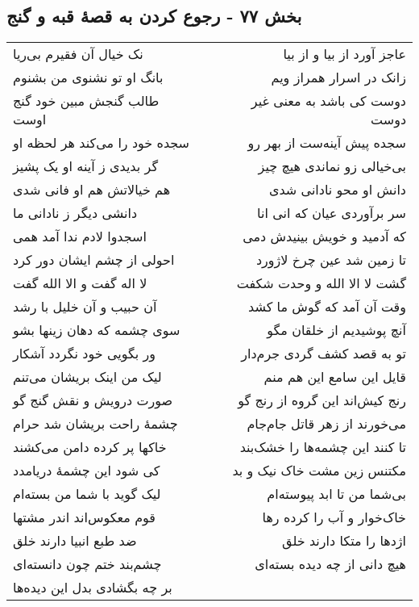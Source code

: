 \begin{center}
\section*{بخش ۷۷ - رجوع کردن به قصهٔ قبه و گنج}
\label{sec:sh077}
\begin{longtable}{l p{0.5cm} r}
نک خیال آن فقیرم بی‌ریا
&&
عاجز آورد از بیا و از بیا
\\
بانگ او تو نشنوی من بشنوم
&&
زانک در اسرار همراز ویم
\\
طالب گنجش مبین خود گنج اوست
&&
دوست کی باشد به معنی غیر دوست
\\
سجده خود را می‌کند هر لحظه او
&&
سجده پیش آینه‌ست از بهر رو
\\
گر بدیدی ز آینه او یک پشیز
&&
بی‌خیالی زو نماندی هیچ چیز
\\
هم خیالاتش هم او فانی شدی
&&
دانش او محو نادانی شدی
\\
دانشی دیگر ز نادانی ما
&&
سر برآوردی عیان که انی انا
\\
اسجدوا لادم ندا آمد همی
&&
که آدمید و خویش بینیدش دمی
\\
احولی از چشم ایشان دور کرد
&&
تا زمین شد عین چرخ لاژورد
\\
لا اله گفت و الا الله گفت
&&
گشت لا الا الله و وحدت شکفت
\\
آن حبیب و آن خلیل با رشد
&&
وقت آن آمد که گوش ما کشد
\\
سوی چشمه که دهان زینها بشو
&&
آنچ پوشیدیم از خلقان مگو
\\
ور بگویی خود نگردد آشکار
&&
تو به قصد کشف گردی جرم‌دار
\\
لیک من اینک بریشان می‌تنم
&&
قایل این سامع این هم منم
\\
صورت درویش و نقش گنج گو
&&
رنج کیش‌اند این گروه از رنج گو
\\
چشمهٔ راحت بریشان شد حرام
&&
می‌خورند از زهر قاتل جام‌جام
\\
خاکها پر کرده دامن می‌کشند
&&
تا کنند این چشمه‌ها را خشک‌بند
\\
کی شود این چشمهٔ دریامدد
&&
مکتنس زین مشت خاک نیک و بد
\\
لیک گوید با شما من بسته‌ام
&&
بی‌شما من تا ابد پیوسته‌ام
\\
قوم معکوس‌اند اندر مشتها
&&
خاک‌خوار و آب را کرده رها
\\
ضد طبع انبیا دارند خلق
&&
اژدها را متکا دارند خلق
\\
چشم‌بند ختم چون دانسته‌ای
&&
هیچ دانی از چه دیده بسته‌ای
\\
بر چه بگشادی بدل این دیده‌ها

\end{longtable}
\end{center}

